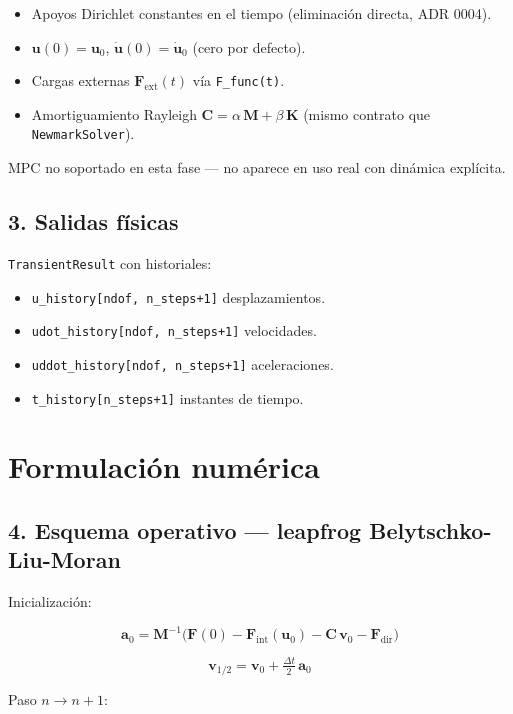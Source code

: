 \documentclass[11pt,letterpaper,oneside]{report}
\begin{document}
\begin{itemize}
  \item Apoyos Dirichlet constantes en el tiempo (eliminación directa, ADR 0004).
  \item $\mathbf{u}(0) = \mathbf{u}_0$, $\dot{\mathbf{u}}(0) = \dot{\mathbf{u}}_0$ (cero por defecto).
  \item Cargas externas $\mathbf{F}_\text{ext}(t)$ vía \texttt{F\_func(t)}.
  \item Amortiguamiento Rayleigh $\mathbf{C} = \alpha\,\mathbf{M} + \beta\,\mathbf{K}$ (mismo contrato que \texttt{NewmarkSolver}).
\end{itemize}

MPC no soportado en esta fase --- no aparece en uso real con dinámica explícita.

\subsection{3. Salidas físicas}

\texttt{TransientResult} con historiales:

\begin{itemize}
  \item \texttt{u\_history[ndof, n\_steps+1]} desplazamientos.
  \item \texttt{udot\_history[ndof, n\_steps+1]} velocidades.
  \item \texttt{uddot\_history[ndof, n\_steps+1]} aceleraciones.
  \item \texttt{t\_history[n\_steps+1]} instantes de tiempo.
\end{itemize}


\section{Formulación numérica}

\subsection{4. Esquema operativo --- leapfrog Belytschko-Liu-Moran}

Inicialización:

\[
\mathbf{a}_0 = \mathbf{M}^{-1}\big(\mathbf{F}(0) - \mathbf{F}_\text{int}(\mathbf{u}_0) - \mathbf{C}\,\mathbf{v}_0 - \mathbf{F}_\text{dir}\big)
\]

\[
\mathbf{v}_{1/2} = \mathbf{v}_0 + \tfrac{\Delta t}{2}\,\mathbf{a}_0
\]

Paso $n \to n+1$:
\end{document}
